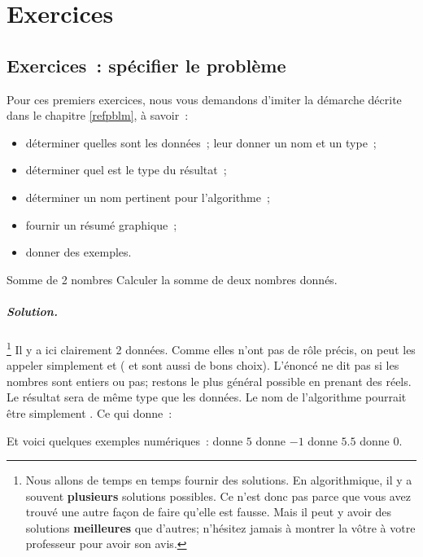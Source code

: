 \chapter{Exercices}

\minitoc



\section{Exercices~: spécifier le problème}

Pour ces premiers exercices, nous vous demandons d’imiter la démarche décrite
dans le chapitre \ref{refpblm}, à savoir~:

\begin{itemize}
	\item déterminer quelles sont les données~;
		leur donner un nom et un type~;
	\item déterminer quel est le type du résultat~;
	\item déterminer un nom pertinent pour l’algorithme~;
	\item fournir un résumé graphique~;
	\item donner des exemples.
\end{itemize}

\begin{Exercice}{Somme de 2 nombres}
	Calculer la somme de deux nombres donnés.
	\paragraph{Solution.}%
	\footnote{%
		Nous allons de temps en temps 
		fournir des solutions.
		En algorithmique,
		il y a souvent \textbf{plusieurs} solutions possibles.
		Ce n’est donc pas parce que vous avez trouvé une autre façon de faire qu'elle est fausse.
		Mais il peut y avoir des solutions \textbf{meilleures}
		que d’autres; 
		n’hésitez jamais à montrer la vôtre
		à votre professeur pour avoir son avis.
	}
	Il y a ici clairement 2 données.
	Comme elles n’ont pas de rôle précis,
	on peut les appeler simplement 
	et 
	( et  sont aussi de bons choix).
	L’énoncé ne dit pas si les nombres sont entiers ou pas;
	restons le plus général possible en prenant des réels.
	Le résultat sera de même type que les données.
	Le nom de l’algorithme pourrait être simplement .
	Ce qui donne~:
	\begin{center}
	\end{center}			 
	Et voici quelques exemples numériques~:	
	 donne $5$      \quad
	 donne $-1$    \quad
	 donne $5.5$  \quad
	 donne $0$.
\end{Exercice}

